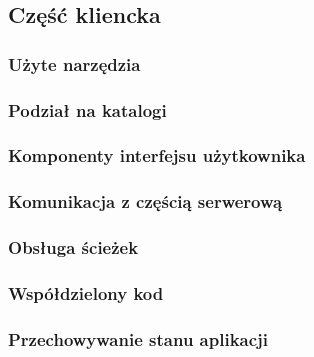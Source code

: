 \subsection{Część kliencka}

\subsubsection{Użyte narzędzia}

\subsubsection{Podział na katalogi}

\subsubsection{Komponenty interfejsu użytkownika}

\subsubsection{Komunikacja z częścią serwerową}

\subsubsection{Obsługa ścieżek}

\subsubsection{Współdzielony kod}

\subsubsection{Przechowywanie stanu aplikacji}
